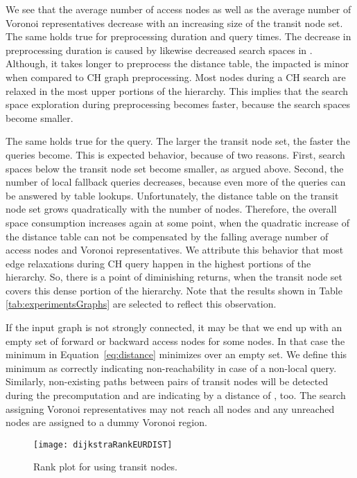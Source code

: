 \documentclass{llncs}
\begin{document}
We see that the average number of access nodes as well as the average number of Voronoi representatives decrease with an increasing size of the transit node set.
The same holds true for preprocessing duration and query times.
The decrease in preprocessing duration is caused by likewise decreased search spaces in .
Although, it takes longer to preprocess the distance table, the impacted is minor when compared to CH graph preprocessing.
Most nodes during a CH search are relaxed in the most upper portions of the hierarchy.
This implies that the search space exploration during preprocessing becomes faster, because the search spaces become smaller.

The same holds true for the query.
The larger the transit node set, the faster the queries become.
This is expected behavior, because of two reasons.
First, search spaces below the transit node set become smaller, as argued above.
Second, the number of local fallback queries decreases, because even more of the queries can be answered by table lookups.
Unfortunately, the distance table on the transit node set grows quadratically with the number of nodes.
Therefore, the overall space consumption increases again at some point, when the quadratic increase of the distance table can not be compensated by the falling average number of access nodes and Voronoi representatives.
We attribute this behavior that most edge relaxations during CH query happen in the highest portions of the hierarchy.
So, there is a point of diminishing returns, when the transit node set covers this dense portion of the hierarchy.
Note that the results shown in Table  \ref{tab:experimentsGraphs} are selected to reflect this observation.

If the input graph is not strongly connected, it may be that we end up with an empty set of forward or backward access nodes for some nodes.
In that case the minimum in Equation~\ref{eq:distance} minimizes over an empty set.
We define this minimum as  correctly indicating non-reachability in case of a non-local query.
Similarly, non-existing paths between pairs of transit nodes will be detected during the precomputation and are indicating by a distance of , too.
The search assigning Voronoi representatives may not reach all nodes and any unreached nodes are assigned to a dummy Voronoi region.

\begin{figure}[b!]
	\centering
	\texttt{[image: dijkstraRankEURDIST]}
    \caption{Rank plot for using  transit nodes.}
	\label{fig:rankPlots_dist}
\end{figure}
\end{document}
